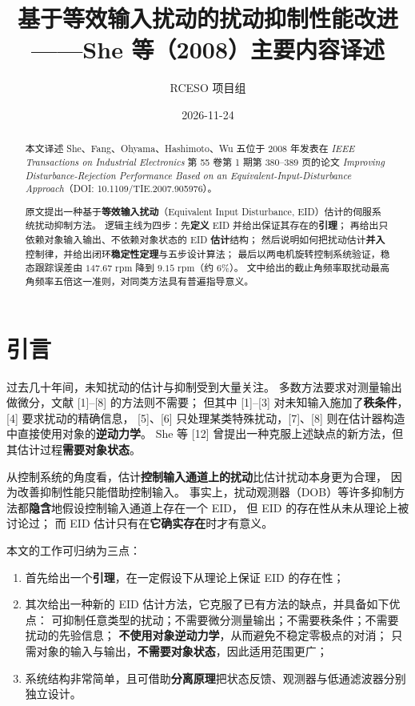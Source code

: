 \documentclass[11pt,a4paper]{ctexart}
\title{\bfseries 基于等效输入扰动的扰动抑制性能改进\\[2mm]
\large ——She 等（2008）主要内容译述}
\author{RCESO 项目组}
\date{2026-11-24}
\begin{document}
\maketitle

\begin{abstract}
\noindent
本文译述 She、Fang、Ohyama、Hashimoto、Wu 五位于 2008 年发表在
\emph{IEEE Transactions on Industrial Electronics}
第 55 卷第 1 期第 380--389 页的论文
\emph{Improving Disturbance-Rejection Performance Based on an
Equivalent-Input-Disturbance Approach}（DOI: 10.1109/TIE.2007.905976）。

原文提出一种基于\textbf{等效输入扰动}（Equivalent Input Disturbance, EID）估计的伺服系统扰动抑制方法。
逻辑主线为四步：先\textbf{定义} EID 并给出保证其存在的\textbf{引理}；
再给出只依赖对象输入输出、不依赖对象状态的 EID \textbf{估计}结构；
然后说明如何把扰动估计\textbf{并入}控制律，并给出闭环\textbf{稳定性定理}与五步设计算法；
最后以两电机旋转控制系统验证，稳态跟踪误差由 $147.67$ rpm 降到 $9.15$ rpm（约 $6\%$）。
文中给出的截止角频率取扰动最高角频率五倍这一准则，对同类方法具有普遍指导意义。
\end{abstract}

\tableofcontents
\newpage

\section{引言}

过去几十年间，未知扰动的估计与抑制受到大量关注。
多数方法要求对测量输出做微分，文献 [1]--[8] 的方法则不需要；
但其中 [1]--[3] 对未知输入施加了\textbf{秩条件}，[4] 要求扰动的精确信息，
[5]、[6] 只处理某类特殊扰动，[7]、[8] 则在估计器构造中直接使用对象的\textbf{逆动力学}。
She 等 [12] 曾提出一种克服上述缺点的新方法，但其估计过程\textbf{需要对象状态}。

从控制系统的角度看，估计\textbf{控制输入通道上的扰动}比估计扰动本身更为合理，
因为改善抑制性能只能借助控制输入。
事实上，扰动观测器（DOB）等许多抑制方法都\textbf{隐含}地假设控制输入通道上存在一个 EID，
但 EID 的存在性从未从理论上被讨论过；
而 EID 估计只有在\textbf{它确实存在}时才有意义。

本文的工作可归纳为三点：
\begin{enumerate}[label=(\arabic*)]
\item 首先给出一个\textbf{引理}，在一定假设下从理论上保证 EID 的存在性；
\item 其次给出一种新的 EID 估计方法，它克服了已有方法的缺点，并具备如下优点：
可抑制任意类型的扰动；不需要微分测量输出；不需要秩条件；不需要扰动的先验信息；
\textbf{不使用对象逆动力学}，从而避免不稳定零极点的对消；
只需对象的输入与输出，\textbf{不需要对象状态}，因此适用范围更广；
\item 系统结构非常简单，且可借助\textbf{分离原理}把状态反馈、观测器与低通滤波器分别独立设计。
\end{enumerate}
\end{document}
